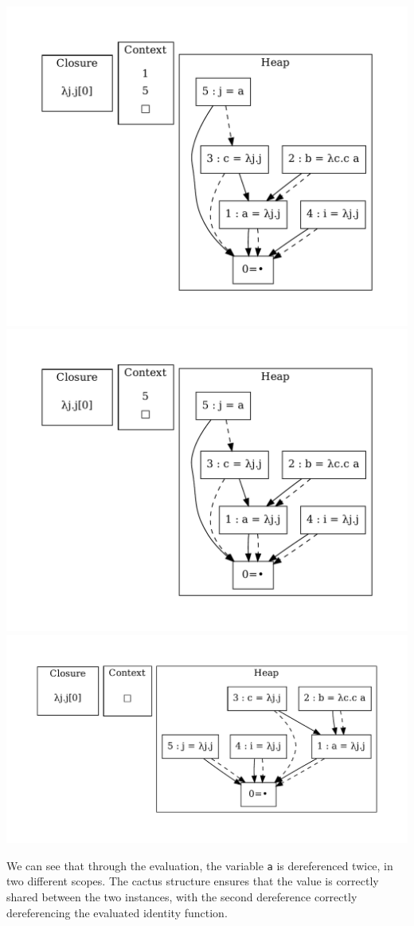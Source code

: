 \includegraphics[width=0.99\linewidth/2]{figures/21.pdf}
\includegraphics[width=0.99\linewidth/2]{figures/22.pdf}
\includegraphics[width=0.99\linewidth/2]{figures/23.pdf}

We can see that through the evaluation, the variable \texttt{a} is dereferenced
twice, in two different scopes. The cactus structure ensures that the value is
correctly shared between the two instances, with the second dereference
correctly dereferencing the evaluated identity function. 

